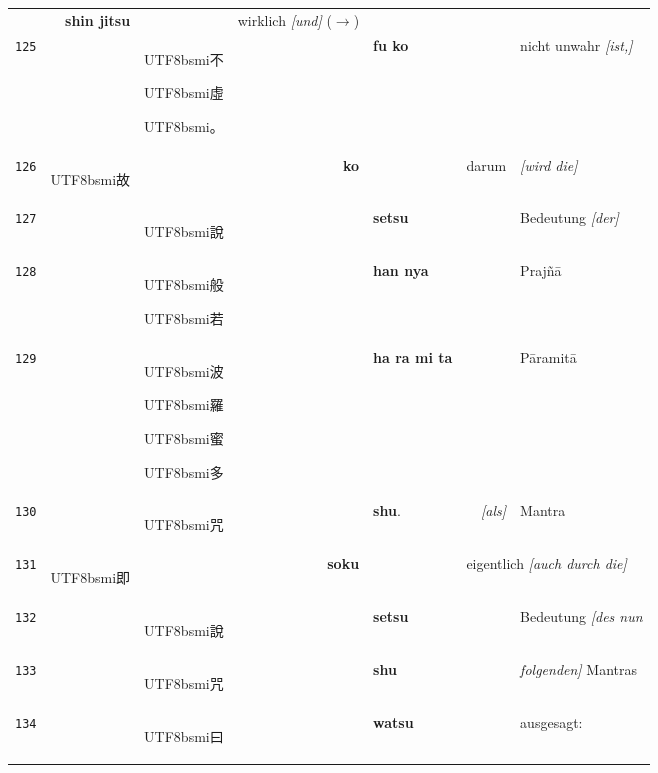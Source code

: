 \documentclass[
DIV=calc,
BCOR=5mm,
11pt,
headings=small,
oneside,
bibtotocnumbered,
english,ngerman]{scrartcl}
\newcommand{\cnbsmi}[1]{\begin{CJK}{UTF8}{bsmi}#1\end{CJK}}
\begin{document}
\begin{center}
\begin{tabular}{r|rl|rl|rl}
  ~ & \textbf{shin jitsu}  &
  ~ & \textrm{wirklich \emph{[und]} {\tiny ($\rightarrow$)}} \\  
{\tiny\texttt{125}}&
  ~ & \cnbsmi{不} \cnbsmi{虛} \cnbsmi{。}&
  ~ & \textbf{fu ko} &
  ~ & \textrm{nicht unwahr \emph{[ist,]}} \\
{\tiny\texttt{126}}&
  \cnbsmi{故} & ~ &
  \textbf{ko} & ~ &
  \textrm{darum} & \textrm{\emph{[wird die]} }\\  
{\tiny\texttt{127}}&
  ~ & \cnbsmi{說} & 
  ~ & \textbf{setsu} &
  ~ & \textrm{Bedeutung \emph{[der]}} \\  
 {\tiny\texttt{128}}&
  ~ & \cnbsmi{般} \cnbsmi{若} &
  ~ & \textbf{han nya} &
  ~ & \textrm{Prajñā} \\  
{\tiny\texttt{129}}&
  ~ & \cnbsmi{波} \cnbsmi{羅} \cnbsmi{蜜} \cnbsmi{多}&
  ~ & \textbf{ha ra mi ta} &
  ~ & \textrm{Pāramitā} \\ 
{\tiny\texttt{130}}&
  ~ & \cnbsmi{咒} &
  ~ & \textbf{shu}. & 
  \textrm{\emph{[als]}} & \textrm{Mantra} \\
{\tiny\texttt{131}}&
  \cnbsmi{即} & ~ & 
  \textbf{soku} & ~ &
  \multicolumn{2}{l}{\textrm{eigentlich \emph{[auch durch die]}}} \\  
{\tiny\texttt{132}}&
  ~ & \cnbsmi{說} &
  ~ & \textbf{setsu} & 
  ~ & \textrm{Bedeutung \emph{[des nun}}\\
{\tiny\texttt{133}}&
  ~ & \cnbsmi{咒} &
  ~ & \textbf{shu}  & 
  ~ & \textrm{\emph{folgenden]} Mantras} \\
{\tiny\texttt{134}}&
  ~ & \cnbsmi{曰} &
  ~ & \textbf{watsu} & 
  ~ & \textrm{ausgesagt:} \\ 
\hline
\end{tabular}



\end{center}
\end{document}
